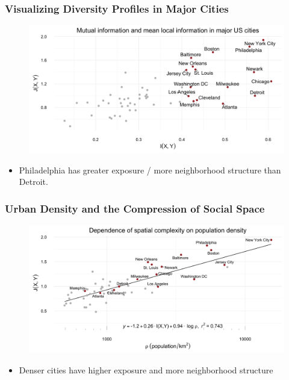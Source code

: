 \documentclass{beamer}
\begin{document}
	\begin{frame}\frametitle{Visualizing Diversity Profiles in Major Cities}
		\centering
		\begin{figure}
	    	\centering
	    	\includegraphics[width=\textwidth]{figs/mutual_fisher.png}
	    \end{figure}
	    \begin{itemize}
	    	\item Philadelphia has greater exposure / more neighborhood structure than Detroit. 
	    \end{itemize}
	\end{frame}
	\iflong
	\begin{frame}\frametitle{Urban Density and the Compression of Social Space}
		\centering
		\begin{figure}
	    	\centering
	    	\includegraphics[width=\textwidth]{figs/density_fisher.png}
	    \end{figure}
	    
	    \begin{itemize}
		    \item Denser cities have higher exposure and more neighborhood structure
	    \end{itemize}

	\end{frame}
	\fi
\end{document}
